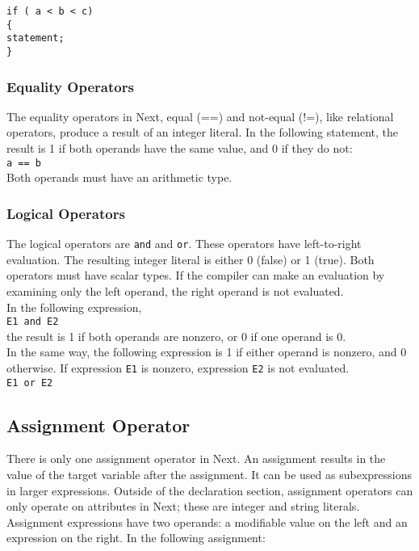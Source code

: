 \documentclass[12pt]{article}
\begin{document}
\texttt{if ( a < b < c) \\
\indent \{ \\
\indent \indent statement; \\
\indent \} }

\subsubsection{Equality Operators}
The equality operators in Next, equal (==) and not-equal (!=), like relational operators, produce a result of an integer literal.  In the following statement, the result is 1 if both operands have the same value, and 0 if they do not: \\

\texttt{a == b} \\

\noindent  Both operands must have an arithmetic type.

\subsubsection{Logical Operators}
The logical operators are \texttt{and} and \texttt{or}.  These operators have left-to-right evaluation.  The resulting integer literal is either 0 (false) or 1 (true).  Both operators must have scalar types.  If the compiler can make an evaluation by examining only the left operand, the right operand is not evaluated. \\

\noindent In the following expression, \\

\texttt{E1 and E2} \\

\noindent the result is 1 if both operands are nonzero, or 0 if one operand is 0.\\

\noindent In the same way, the following expression is 1 if either operand is nonzero, and 0 otherwise.  If expression \texttt{E1} is nonzero, expression \texttt{E2} is not evaluated. \\

\texttt{E1 or E2}

\subsection{Assignment Operator}
There is only one assignment operator in Next.  An assignment results in the value of the target variable after the assignment.  It can be used as subexpressions in larger expressions.  Outside of the declaration section, assignment operators can only operate on attributes in Next; these are integer and string literals.  Assignment expressions have two operands: a modifiable value on the left and an expression on the right.  In the following assignment: \\
\end{document}
